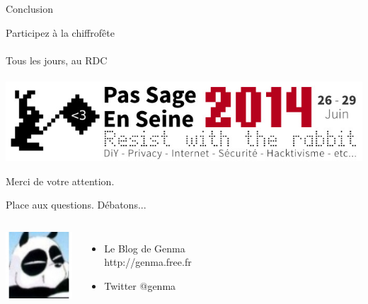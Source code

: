 \documentclass{beamer}
\begin{document}
\begin{frame}
\begin{center}
\Huge{Conclusion}
\end{center}
\end{frame}


\begin{frame}
\begin{center}
\Huge{Participez à la chiffrofête}
\\~\\
\Huge{Tous les jours, au RDC}
\\~\\
\includegraphics[scale=0.5] {logoPSES.jpg} 
\end{center}
\end{frame}


\begin{frame}

\Huge{\centerline{Merci de votre attention.}}
\Huge{\centerline{Place aux questions. Débatons...}}

\begin{columns}[c] 
\includegraphics[width=2.5cm,height=2.5cm]{./Genma.jpg} 
\Large{
\begin{itemize}
\item Le Blog de Genma \\ http://genma.free.fr
\item Twitter @genma
\end{itemize}
}
\end{columns}

\end{frame}
\end{document}
